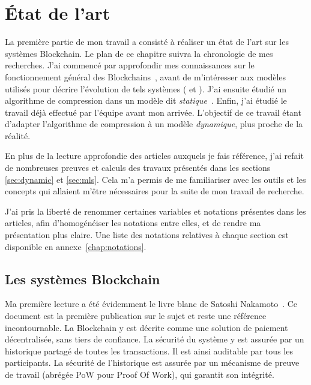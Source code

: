 \chapter{État de l'art}\label{chap:etat_art}

	La première partie de mon travail a consisté à réaliser un état de l'art sur
	les systèmes Blockchain. Le plan de ce chapitre suivra la chronologie de mes
	recherches. J'ai commencé par approfondir mes connaissances sur le
	fonctionnement général des Blockchains~\cite{bitcoin}, avant de
	m'intéresser aux modèles utilisés pour décrire l'évolution de tels systèmes
	(\cite{static_backbone} et \cite{dynamic_backbone}). J'ai ensuite étudié un
	algorithme de compression dans un modèle dit \textit{statique}~\cite{mls}.
	Enfin, j'ai étudié le travail déjà effectué par l'équipe avant mon arrivée.
	L'objectif de ce travail étant d'adapter l'algorithme de compression à un
	modèle \textit{dynamique}, plus proche de la réalité.

	En plus de la lecture approfondie des articles auxquels je fais référence,
	j'ai refait de nombreuses preuves et calculs des travaux présentés dans les
	sections \ref{sec:dynamic} et \ref{sec:mls}. Cela m'a permis de me
	familiariser avec les outils et les concepts qui allaient m'être nécessaires
	pour la suite de mon travail de recherche.

    J'ai pris la liberté de renommer certaines variables et notations présentes
    dans les articles, afin d'homogénéiser les notations entre elles, et de
    rendre ma présentation plus claire. Une liste des notations relatives à
    chaque section est disponible en annexe~\ref{chap:notations}.
    

\section{Les systèmes Blockchain}\label{sec:blockchain}

    Ma première lecture a été évidemment le livre blanc de Satoshi
    Nakamoto~\cite{bitcoin}. Ce document est la première publication sur le
    sujet et reste une référence incontournable. La Blockchain y est décrite
    comme une solution de paiement décentralisée, sans tiers de confiance. La
    sécurité  du système y est assurée par un historique partagé de toutes les
    transactions. Il est ainsi auditable par tous les participants. La sécurité
    de l'historique est assurée par un mécanisme de preuve de travail (abrégée
    PoW pour Proof Of Work), qui garantit son intégrité.

